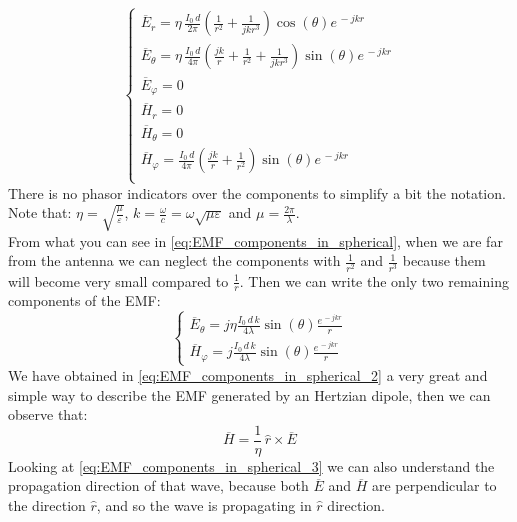 \begin{equation}\label{eq:EMF_components_in_spherical}
    \begin{cases}
        \overline{E}_r=\eta \, \frac{I_0\, d}{2\pi}\left(\frac{1}{r^2}+\frac{1}{jkr^3}\right)\cos(\theta)e^{\,-jkr}\\[5pt]
        \overline{E}_\theta=\eta\,\frac{I_0\,d}{4\pi}\left(\frac{jk}{r}+\frac{1}{r^2}+\frac{1}{jkr^3}\right)\sin(\theta)e^{\,-jkr}\\[5pt]
        \overline{E}_\varphi=0\\[5pt]
        \overline{H}_r=0\\[5pt]
        \overline{H}_\theta=0\\[5pt]
        \overline{H}_\varphi=\frac{I_0\,d}{4\pi}\left(\frac{jk}{r}+\frac{1}{r^2}\right)\sin(\theta)e^{\,-jkr}\\[5pt]
    \end{cases}
\end{equation}
There is no phasor indicators over the components to simplify a bit the notation.\\
Note that: $\eta =\sqrt{\frac{\mu}{\varepsilon}}$, $k=\frac{\omega}{c}=\omega\sqrt{\mu\varepsilon}$ and $\mu=\frac{2\pi}{\lambda}$.\\
From what you can see in \cref{eq:EMF_components_in_spherical}, when we are far from the antenna we can neglect the components with $\frac{1}{r^2}$ and $\frac{1}{r^3}$ because them will become very small compared to $\frac{1}{r}$. Then we can write the only two remaining components of the EMF:
\begin{equation}\label{eq:EMF_components_in_spherical_2}
\begin{cases}
    \overline{E}_\theta = j\eta \frac{I_0\,d\,k}{4\lambda}\sin(\theta)\frac{e^{\,-jkr}}{r}\\[5pt]
    \overline{H}_\varphi = j\frac{I_0\,d\,k}{4\lambda}\sin(\theta)\frac{e^{\,-jkr}}{r}
\end{cases}
\end{equation}
We have obtained in \cref{eq:EMF_components_in_spherical_2} a very great and simple way to describe the EMF generated by an Hertzian dipole, then we can observe that:
\begin{equation}\label{eq:EMF_components_in_spherical_3}
    \overline{H}=\frac{1}{\eta}\,\hat{r}\times\overline{E} 
\end{equation}
Looking at \cref{eq:EMF_components_in_spherical_3} we can also understand the propagation direction of that wave, because both $\overline{E}$ and $\overline{H}$ are perpendicular to the direction $\hat{r}$, and so the wave is propagating in $\hat{r}$ direction.\\
